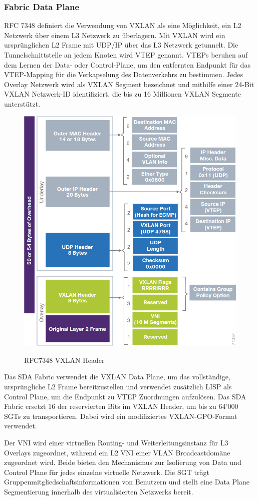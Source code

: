 \subsubsection{Fabric Data Plane}
RFC 7348 definiert die Verwendung von VXLAN als eine Möglichkeit, ein L2 Netzwerk über einem L3 Netzwerk zu überlagern. Mit VXLAN wird ein ursprünglichen L2 Frame mit UDP/IP über das L3 Netzwerk getunnelt. Die Tunnelschnittstelle an jedem Knoten wird VTEP genannt. VTEPs beruhen auf dem Lernen der Data- oder Control-Plane, um den entfernten Endpunkt für das VTEP-Mapping für die Verkapselung des Datenverkehrs zu bestimmen. Jedes Overlay Netzwerk wird als VXLAN Segment bezeichnet und mithilfe einer 24-Bit VXLAN Netzwerk-ID identifiziert, die bis zu 16 Millionen VXLAN Segmente unterstützt. \cite{rfc-7348}

\begin{figure}[H]
	\centering
	\includegraphics[width=0.7\linewidth]{img/RFC7348-VXLAN-Header.png}\\[1px]
	\caption{RFC7348 VXLAN Header \cite{sda-designguide}}
	\label{fig:RFC7348 VXLAN Header}
\end{figure}

Das SDA Fabric verwendet die VXLAN Data Plane, um das vollständige, ursprüngliche L2 Frame bereitzustellen und verwendet zusätzlich LISP als Control Plane, um die Endpunkt zu VTEP Zuordnungen aufzulösen. Das SDA Fabric ersetzt 16 der reservierten Bits im VXLAN Header, um bis zu 64'000 SGTs zu transportieren. Dabei wird ein modifiziertes VXLAN-GPO-Format verwendet.

Der VNI wird einer virtuellen Routing- und Weiterleitungsinstanz für L3 Overlays zugeordnet, während ein L2 VNI einer VLAN Broadcastdomäne zugeordnet wird. Beide bieten den Mechanismus zur Isolierung von Data und Control Plane für jedes einzelne virtuelle Netzwerk. Die SGT trägt Gruppenmitgliedschaftsinformationen von Benutzern und stellt eine Data Plane Segmentierung innerhalb des virtualisierten Netzwerks bereit. \cite{sda-designguide}

